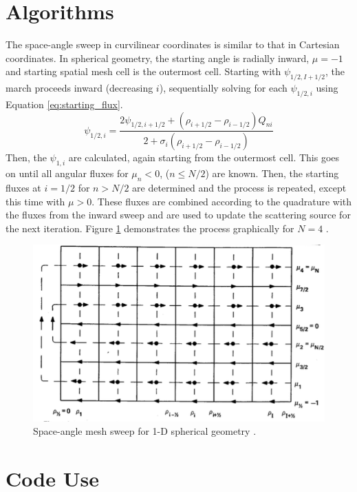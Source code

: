 \documentclass[11pt, oneside]{article}   	%
\begin{document}
\section{Algorithms}

The space-angle sweep in curvilinear coordinates is similar to that in Cartesian coordinates. In spherical geometry, the starting angle is radially inward, $\mu = -1$ and starting spatial mesh cell is the outermost cell. Starting with $\psi_{1/2, I+1/2}$, the march proceeds inward (decreasing $i$), sequentially solving for each $\psi_{1/2, i}$ using Equation \ref{eq:starting_flux}. 
%
\begin{equation}\label{eq:starting_flux}
\psi_{1/2, i} = \frac{2\psi_{1/2, i+1/2}+\left(\rho_{i+1/2} - \rho_{i-1/2}\right)Q_{ni}}{2+\sigma_i\left(\rho_{i+1/2} - \rho_{i-1/2}\right)}
\end{equation}
%
Then, the $\psi_{1,i}$ are calculated, again starting from the outermost cell. This goes on until all angular fluxes for $\mu_n<0$, ($n \leq N/2$) are known. Then, the starting fluxes at $i=1/2$ for $n > N/2$ are determined and the process is repeated, except this time with $\mu > 0$. These fluxes are combined according to the quadrature with the fluxes from the inward sweep and are used to update the scattering source for the next iteration. Figure \ref{fig:algorithm} demonstrates the process graphically for $N=4$ \cite{lm}.
%
\begin{figure}\label{fig:algorithm}
\includegraphics[width=14cm]{algorithm}
\caption{Space-angle mesh sweep for 1-D spherical geometry \cite{lm}.}
\end{figure}

\section{Code Use}
\end{document}
